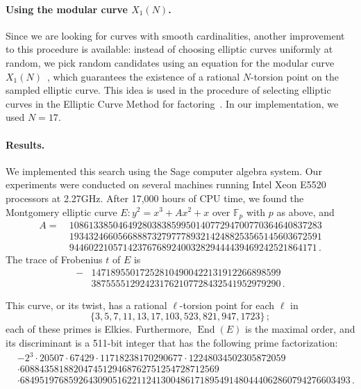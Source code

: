 \documentclass{llncs}
\newcommand{\F}{\mathbb{F}}
\DeclareMathOperator{\End}{End}
\begin{document}
\paragraph{Using the modular curve $X_1(N)$.}
Since we are looking for curves with smooth cardinalities, another
improvement to this procedure is available: instead of choosing elliptic
curves uniformly at random, we pick random candidates using
an equation for the modular curve $X_1(N)$~\cite{sutherland2012constructing},
which guarantees the existence of a rational $N$-torsion point
on the sampled elliptic curve.
This idea is used
in the procedure of selecting elliptic curves in the Elliptic Curve Method
for factoring~\cite{ECM20,GMP-ECM}.
In our implementation, we used $N = 17$. 

\paragraph{Results.}
We implemented this search using the Sage computer algebra system.
Our experiments were conducted on several machines running
Intel Xeon E5520 processors at 2.27GHz. %
After 17,000 hours of CPU time, we found the Montgomery elliptic curve 
$
	E : y^2 = x^3 + A x^2 + x
$
over $\F_p$ with $p$ as above, and
\[
\begin{aligned}
A =\ 
& 1086133850464928038385995014077294700770364640837283 \\
& 1934324660566888732797778932142488253565145603672591 \\
& 944602210571423767689240032829444439469242521864171\,.
\end{aligned}
\]
The trace of Frobenius $t$ of $E$ is
\[
\begin{aligned}
-&147189550172528104900422131912266898599 \\
&387555512924231762107728432541952979290\,.
\end{aligned}
\]

This curve, or its twist, has a rational $\ell$-torsion point 
for each $\ell$ in
\[
  \{3, 5, 7, 11, 13, 17, 103, 523, 821, 947, 1723\}
  \,;
\]
each of these primes is Elkies.
Furthermore, $\End(E)$ is the maximal order, and its discriminant is
a 511-bit integer that has the following prime factorization:
\[
\begin{aligned}
& -2^3 \cdot 20507 \cdot 67429 \cdot 11718238170290677 \cdot 12248034502305872059 \\
& \cdot 60884358188204745129468762751254728712569\\
& \cdot 68495197685926430905162211241300486171895491480444062860794276603493\,.
\end{aligned}
\]
\end{document}
